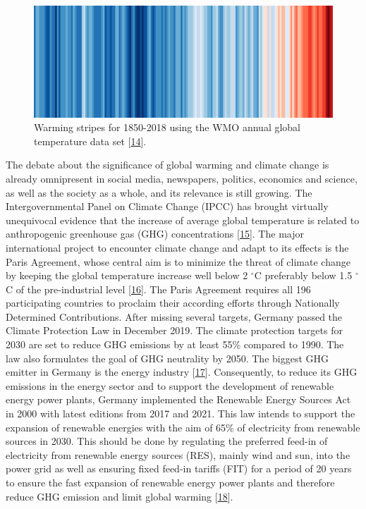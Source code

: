 \documentclass[a4paper,11pt]{article}
\begin{document}
\begin{figure}

{\centering \includegraphics[width=1\linewidth,height=0.07\textheight]{figures/wmo_stripes} 

}

\caption{Warming stripes for 1850-2018 using the WMO annual global temperature data set {[}\protect\hyperlink{ref-EdHawkins.2018}{14}{]}.}\label{fig:wmo}
\end{figure}
The debate about the significance of global warming and climate change is already omnipresent in social media, newspapers, politics, economics and science, as well as the society as a whole, and its relevance is still growing. The Intergovernmental Panel on Climate Change (IPCC) has brought virtually unequivocal evidence that the increase of average global temperature is related to anthropogenic greenhouse gas (GHG) concentrations
{[}\protect\hyperlink{ref-IntergovernmentalPanelonClimateChange.2014}{15}{]}. The major international project to encounter climate change and adapt to its effects is the Paris Agreement, whose central aim is to minimize the threat of climate
change by keeping the global temperature increase well below 2 \(^\circ\)C preferably below 1.5 \(^\circ\)C of the pre-industrial level {[}\protect\hyperlink{ref-UnitedNations.2015}{16}{]}. The Paris Agreement requires all 196 participating countries to proclaim their according efforts through Nationally Determined Contributions. After missing several targets, Germany passed the Climate Protection Law in December 2019. The climate protection targets for 2030 are set to reduce GHG emissions by at least 55\% compared to 1990. The law also formulates the goal of GHG neutrality by 2050. The biggest GHG emitter in Germany is the energy industry {[}\protect\hyperlink{ref-Umweltbundesamt.2018}{17}{]}. Consequently, to reduce its GHG emissions in the energy sector and to support the development of renewable energy power plants, Germany implemented the Renewable Energy Sources Act in 2000 with latest editions from 2017 and 2021. This law intends to support the expansion of renewable energies with the aim of 65\% of electricity from renewable sources in 2030. This should be done by regulating the preferred feed-in of electricity from renewable energy sources (RES), mainly wind and sun, into the power grid as well as ensuring fixed feed-in tariffs (FIT) for a period of 20 years to ensure the fast expansion of renewable energy power plants and therefore reduce GHG emission and limit global warming {[}\protect\hyperlink{ref-BundesamtfurJustiz.2021}{18}{]}.
\end{document}
